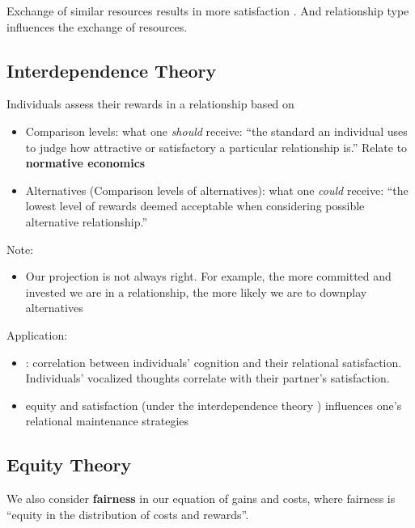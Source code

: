 \documentclass[
]{book}
\providecommand{\tightlist}{%
  \setlength{\itemsep}{0pt}\setlength{\parskip}{0pt}}
\begin{document}
Exchange of similar resources results in more satisfaction \citep{Foa_1980}. And relationship type influences the exchange of resources.

\hypertarget{interdependence-theory}{%
\subsection{Interdependence Theory}\label{interdependence-theory}}

Individuals assess their rewards in a relationship based on

\begin{itemize}
\tightlist
\item
  Comparison levels: what one \emph{should} receive: ``the standard an individual uses to judge how attractive or satisfactory a particular relationship is.'' Relate to \textbf{normative economics}
\item
  Alternatives (Comparison levels of alternatives): what one \emph{could} receive: ``the lowest level of rewards deemed acceptable when considering possible alternative relationship.''
\end{itemize}

Note:

\begin{itemize}
\tightlist
\item
  Our projection is not always right. For example, the more committed and invested we are in a relationship, the more likely we are to downplay alternatives \citep{Rusbult_2010}
\end{itemize}

Application:

\begin{itemize}
\tightlist
\item
  \citep{Vangelisti_2013}: correlation between individuals' cognition and their relational satisfaction. Individuals' vocalized thoughts correlate with their partner's satisfaction.
\item
  equity and satisfaction (under the interdependence theory ) influences one's relational maintenance strategies \citep{Stafford_2006}
\end{itemize}

\hypertarget{equity-theory}{%
\subsection{Equity Theory}\label{equity-theory}}

We also consider \textbf{fairness} in our equation of gains and costs, where fairness is ``equity in the distribution of costs and rewards''\citep{Baxter_2008}.
\end{document}
